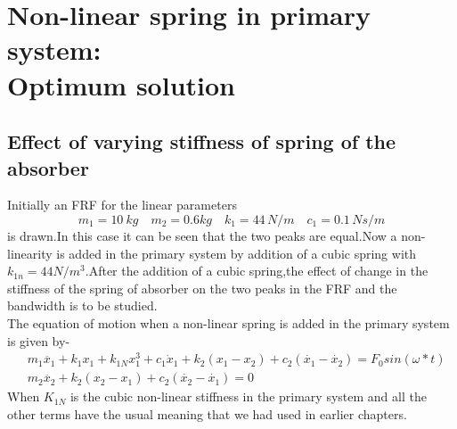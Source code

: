 \section{Non-linear spring in primary system:\\ Optimum solution}
\subsection{Effect of varying stiffness of spring of the absorber } 
Initially an FRF for the linear parameters $$ m_1=10\ kg\quad m_2=0.6kg\quad k_1=44\, N/m\quad c_1=0.1\, Ns/m $$ is drawn.In this case it can be seen that the two peaks are equal.Now a non-linearity is added in the primary system by addition of a cubic spring with $k_{1n}=44 N/m^3$.After the addition of a cubic spring,the effect of change in the stiffness of the spring of absorber on the two peaks in the FRF and the bandwidth is to be studied.\\
 The equation of motion when a non-linear spring is added in the primary system is given by-
  \begin{align}
&m_1\ddot{x_1}+k_1x_1+k_{1N}x_1^3+c_1 \dot x_1 + k_2(x_1-x_2)+c_2(\dot{x_1}-\dot{x_2})=F_0sin(\omega *t) \\
&m_2\ddot{x_2}+k_2(x_2-x_1)+c_{2}(\dot{x_{2}}-\dot{x_{1}})=0
\end{align}
When $K_{1N}$ is the cubic non-linear stiffness in the primary system and all the other terms have the usual meaning that we had used in earlier chapters.\\

